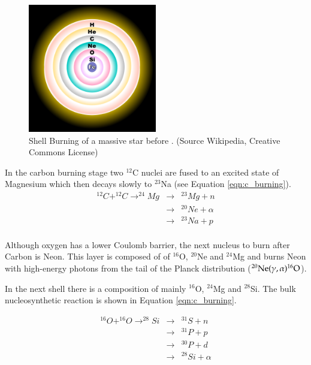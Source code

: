 \begin{figure}[htbp] %
   \centering
   \includegraphics[width=0.5\textwidth]{chapter_intro/plots/fusion_shells.pdf} 
   \caption{Shell Burning of a massive star before . (Source  Wikipedia, Creative Commons License)}
   \label{fig:fusion_shells}
\end{figure}


In the carbon burning stage two $^{12}$C nuclei are fused to an excited state of Magnesium which then decays slowly to $^{23}$Na (see Equation \ref{eqn:c_burning}).
\begin{eqnarray}
^{12}C+^{12}C\rightarrow^{24}Mg&\rightarrow&^{23}Mg+n \nonumber \\
	&\rightarrow&^{20}Ne + \alpha \nonumber \\
	&\rightarrow&^{23}Na +p \nonumber \\
	\label{eqn:c_burning}
\end{eqnarray}

Although oxygen has a lower Coulomb barrier, the next nucleus to burn after Carbon is Neon. This layer is composed of of  $^{16}$O, $^{20}$Ne and $^{24}$Mg and burns Neon with high-energy photons from the tail of the Planck distribution ($\rm ^{20}Ne(\gamma,\alpha)^{16}O$). 

In the next shell there is a composition of mainly $^{16}$O, $^{24}$Mg and $^{28}$Si. The bulk nucleosynthetic reaction is shown in Equation \ref{eqn:c_burning}. 

\begin{eqnarray}
^{16}O+^{16}O\rightarrow^{28}Si&\rightarrow&^{31}S+n \nonumber \\
	&\rightarrow&^{31}P + p \nonumber \\
	&\rightarrow&^{30}P + d \nonumber \\
	&\rightarrow&^{28}Si + \alpha \nonumber \\
	\label{eqn:c_burning}
\end{eqnarray}

